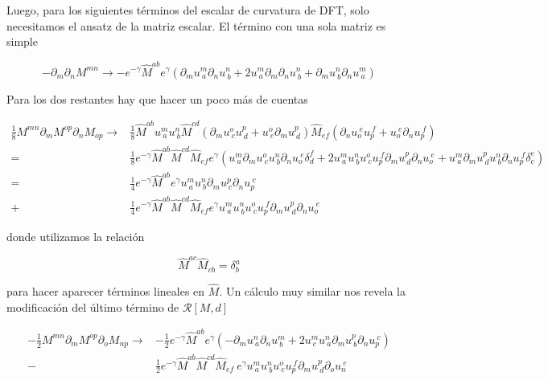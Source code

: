 \documentclass{article}
\numberwithin{equation}{section}
\begin{document}
Luego, para los siguientes términos del escalar de curvatura de DFT, solo necesitamos el ansatz de la matriz escalar. El término con una sola matriz es simple

\begin{equation}\label{V4}
-\partial_m \partial_n M^{m n} \longrightarrow - e^{- \gamma} \hat{M}^{a b} e^{\gamma} \left( \partial_m u^{m}_{\ a} \partial_n u^{n}_{\ b} + 2  u^{m}_{\ a} \partial_m \partial_n u^{n}_{\ b} + \partial_m u^{n}_{\ b} \partial_n u^{m}_{\ a} \right)
\end{equation}

Para los dos restantes hay que hacer un poco más de cuentas

\begin{equation}\label{V5}
\begin{aligned}
\frac{1}{8} M^{m n} \partial_m M^{o p} \partial_n M_{o p} \longrightarrow& \frac{1}{8} \hat{M}^{a b} u^{m}_{\ a} u^{n}_{\ b} \hat{M}^{c d} \left( \partial_m u^{o}_{\ c} u^{p}_{ \ d} + u^{o}_{\ c} \partial_m u^{p}_{ \ d} \right) \hat{M}_{e f} \left( \partial_n u_{o}^{\ e} u_{p}^{ \ f} + u_{o}^{\ e} \partial_n u_{p}^{ \ f} \right)\\
=&\frac{1}{8} e^{-\gamma} \hat{M}^{a b} \hat{M}^{c d}\hat{M}_{e f} e^{\gamma} \left( u^{m}_{\ a} \partial_m u^{o}_{\ c} u^{n}_{\ b} \partial_n u_{o}^{\ e} \delta^f_d + 2 u^{m}_{\ a} u^{n}_{\ b} u^{o}_{\ c} u_{p}^{\ f} \partial_m u^{p}_{\ d} \partial_n u_{o}^{\ e} + u^{m}_{\ a} \partial_m u^{p}_{\ d} u^{n}_{\ b} \partial_n u_{p}^{\ f} \delta^e_c\right)\\
=& \frac{1}{4} e^{-\gamma} \hat{M}^{a b}  e^{\gamma} u^{m}_{\ a} u^{n}_{\ b} \partial_m u^{p}_{\ c}  \partial_n u_{p}^{\ c}\\
+& \frac{1}{4} e^{-\gamma} \hat{M}^{a b} \hat{M}^{c d}\hat{M}_{e f} e^{\gamma} u^{m}_{\ a} u^{n}_{\ b} u^{o}_{\ c} u_{p}^{\ f} \partial_m u^{p}_{\ d} \partial_n u_{o}^{\ e} 
\end{aligned}
\end{equation}

donde utilizamos la relación

\begin{equation}
\hat{M}^{a c} \hat{M}_{c b} = \delta^a_b
\end{equation}

para hacer aparecer términos lineales en $ \hat{M} $. Un cálculo muy similar nos revela la modificación del último término de $ \mathcal{R}[M,d] $

\begin{equation}\label{V6}
\begin{aligned}
- \frac{1}{2} M^{m n} \partial_m M^{o p} \partial_o M_{n p} \longrightarrow& - \frac{1}{2} e^{-\gamma} \hat{M}^{a b}  e^{\gamma} \left( -\partial_m u^{n}_{\ a} \partial_n u^{m}_{\ b} + 2 u^{m}_{\ c} u^{n}_{\ a} \partial_m u^{p}_{\ b} \partial_n u_{p}^{\ c}\right)\\
-& \frac{1}{2} e^{-\gamma} \hat{M}^{a b} \hat{M}^{c d}\hat{M}_{e f} \ e^{\gamma}  u^{m}_{\ a} u^{n}_{\ b} u^{o}_{\ c} u_{p}^{\ f} \partial_m u^{p}_{\ d} \partial_o u_{n}^{\ e} 
\end{aligned}
\end{equation}
\end{document}
